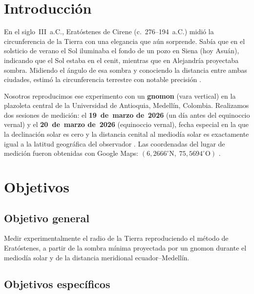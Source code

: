 \section{Introducción}

En el siglo~III~a.C., Eratóstenes de Cirene (c.~276--194~a.C.) midió la
circunferencia de la Tierra con una elegancia que aún sorprende.
Sabía que en el solsticio de verano el Sol iluminaba el fondo de un pozo
en Siena (hoy Asuán), indicando que el Sol estaba en el cenit, mientras
que en Alejandría proyectaba sombra.
Midiendo el ángulo de esa sombra y conociendo la distancia entre ambas
ciudades, estimó la circunferencia terrestre con notable precisión
\citep{Britannica2024}.

Nosotros reproducimos ese experimento con un \textbf{gnomon} (vara
vertical) en la plazoleta central de la Universidad de Antioquia,
Medellín, Colombia.
Realizamos dos sesiones de medición: el \textbf{19~de~marzo de~2026}
(un día antes del equinoccio vernal) y el \textbf{20~de~marzo de~2026}
(equinoccio vernal), fecha especial en la que la declinación solar es
cero y la distancia cenital al mediodía solar es exactamente igual a la
latitud geográfica del observador \citep{PortillaBarbosa2009}.
Las coordenadas del lugar de medición fueron obtenidas con Google Maps:
$(6{,}2666^\circ\text{N},\; 75{,}5694^\circ\text{O})$ \citep{GoogleMaps2026}.

\section{Objetivos}

\subsection{Objetivo general}

Medir experimentalmente el radio de la Tierra reproduciendo el método de
Eratóstenes, a partir de la sombra mínima proyectada por un gnomon
durante el mediodía solar y de la distancia meridional
ecuador--Medellín.

\subsection{Objetivos específicos}


